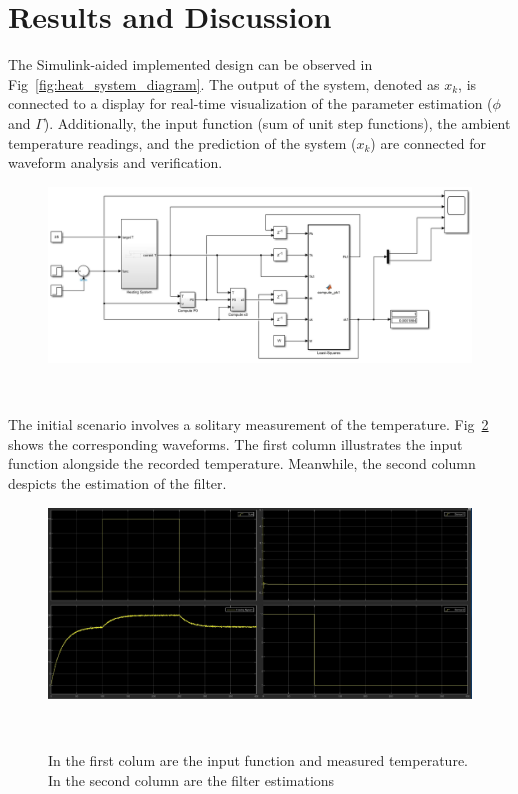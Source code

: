 \section{Results and Discussion}
The Simulink-aided implemented design can be observed in Fig~\ref{fig:heat_system_diagram}. The output of the system, denoted as $x_{k}$, is connected to a display for real-time visualization of the parameter estimation ($\phi$ and $\Gamma$). Additionally, the input function (sum of unit step functions), the ambient temperature readings, and the prediction of the system ($x_{k}$) are connected for waveform analysis and verification.

\begin{figure}[H]
\centering
\includegraphics[width=1\linewidth]{figures/simulink_system.png}
\caption{}
~\label{fig:simulink_system}
\end{figure}

The initial scenario involves a solitary measurement of the temperature. Fig~\ref{fig:simulink_plot} shows the corresponding waveforms. The first column illustrates the input function alongside the recorded temperature. Meanwhile, the second column despicts the estimation of the filter.

\begin{figure}[H]
\centering
\includegraphics[width=1\linewidth]{figures/simulink_plot.png}
\caption{In the first colum are the input function and measured temperature. In the second column are the filter estimations}
~\label{fig:simulink_plot}
\end{figure}


